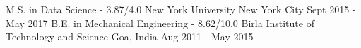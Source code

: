 \begin{cventries}
  \cventry
    {M.S. in Data Science - 3.87/4.0}
    {New York University}
    {New York City}
    {Sept 2015 - May 2017}
    {
    }
  \cventry
    {B.E. in Mechanical Engineering - 8.62/10.0}
    {Birla Institute of Technology and Science}
    {Goa, India}
    {Aug 2011 - May 2015}
    {
    }
\end{cventries}
